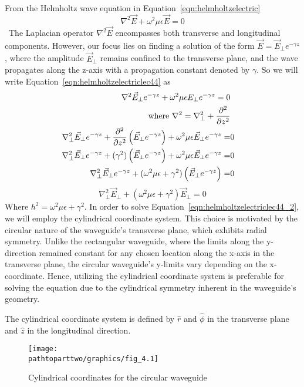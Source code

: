 From the Helmholtz wave equation in Equation~\eqref{eqn:helmholtzelectric} 
\begin{equation}
\nabla^2\vec{E} + \omega^2\mu\epsilon\vec{E}=0
\label{eqn:helmholtzelectriclec44}
\end{equation}\
The Laplacian operator $\nabla^2\vec{E}$ encompasses both transverse and longitudinal components. However, our focus lies on finding a solution of the form $\vec{E}=\vec{E}_{\bot}e^{-\gamma z}$, where the amplitude $\vec{E}_\bot$ remains confined to the transverse plane, and the wave propagates along the z-axis with a propagation constant denoted by $\gamma$. So we will write Equation~\ref{eqn:helmholtzelectriclec44} as
\begin{align*}
\nabla^2\vec{E}_\perp e^{-\gamma z} + \omega^2 \mu\epsilon E_\perp e^{-\gamma z} = 0\\\text{where }\nabla^2 = \nabla^2_\perp + \partialderivative[2]{}{z}&\\
\nabla^2_\perp\vec{E}_\perp e^{-\gamma z} + \partialderivative[2]{}{z}\left(\vec{E}_\perp e^{-\gamma z}\right) + \omega^2\mu\epsilon\vec{E}_\perp e^{-\gamma z} =&  0\\
\nabla^2_\perp\vec{E}_\perp e^{-\gamma z} + (\gamma^2)\left(\vec{E}_\perp e^{-\gamma z}\right) + \omega^2\mu\epsilon\vec{E}_\perp e^{-\gamma z} =& 0\\
\nabla^2_\perp\vec{E}_\perp e^{-\gamma z} + (\omega^2\mu\epsilon + \gamma^2)\left(\vec{E}_\perp e^{-\gamma z}\right) =& 0
\end{align*}
\begin{equation}
\nabla^2_\perp\vec{E}_\perp + (\omega^2\mu\epsilon + \gamma^2)\vec{E}_\perp = 0
\label{eqn:helmholtzelectriclec44_2}
\end{equation}
Where $h^2 = \omega^2\mu\epsilon + \gamma^2$. In order to solve Equation~\ref{eqn:helmholtzelectriclec44_2}, we will employ the cylindrical coordinate system. This choice is motivated by the circular nature of the waveguide's transverse plane, which exhibits radial symmetry. Unlike the rectangular waveguide, where the limits along the y-direction remained constant for any chosen location along the x-axis in the transverse plane, the circular waveguide's y-limits vary depending on the x-coordinate. Hence, utilizing the cylindrical coordinate system is preferable for solving the equation due to the cylindrical symmetry inherent in the waveguide's geometry.
 
The cylindrical coordinate system is defined by $\hat{r}$ and $\hat{\phi}$ in the transverse plane and $\hat{z}$ in the longitudinal direction.
\begin{figure}[h]
\centering
\texttt{[image: \\pathtoparttwo/graphics/fig\_4.1]}
\caption{Cylindrical coordinates for the circular waveguide}
\label{fig:fig4}
\end{figure}

